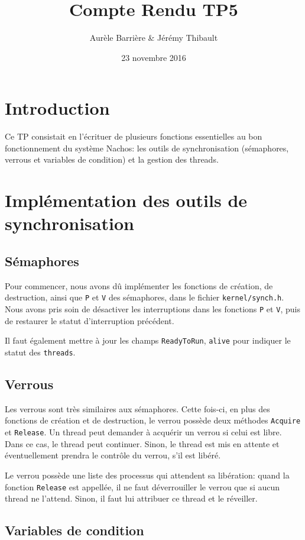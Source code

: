 \documentclass{article}
\title{Compte Rendu TP5}
\author{Aurèle Barrière \& Jérémy Thibault}
\date{23 novembre 2016}
\def\file#1{\texttt{#1}}
\def\fun#1{\texttt{#1}}
\def\obj#1{\texttt{#1}}
\begin{document}
\maketitle

\section*{Introduction}

Ce TP consistait en l'écrituer de plusieurs fonctions essentielles au bon fonctionnement du système Nachos: les outils de synchronisation (sémaphores, verrous et variables de condition) et la gestion des threads.

\section{Implémentation des outils de synchronisation}
\subsection{Sémaphores}

  Pour commencer, nous avons dû implémenter les fonctions de création, de destruction, ainsi que \fun{P} et \fun{V} des sémaphores, dans le fichier \file{kernel/synch.h}. Nous avons pris soin de désactiver les interruptions dans les fonctions \fun{P} et \fun{V}, puis de restaurer le statut d'interruption précédent.

  Il faut également mettre à jour les champs \obj{ReadyToRun}, \obj{alive} pour indiquer le statut des \obj{threads}.

\subsection{Verrous}

  Les verrous sont très similaires aux sémaphores. Cette fois-ci, en plus des fonctions de création et de destruction, le verrou possède deux méthodes \fun{Acquire} et \fun{Release}. Un thread peut demander à acquérir un verrou si celui est libre. Dans ce cas, le thread peut continuer. Sinon, le thread est mis en attente et éventuellement prendra le contrôle du verrou, s'il est libéré. %

  Le verrou possède une liste des processus qui attendent sa libération: quand la fonction \fun{Release} est appellée, il ne faut déverrouiller le verrou que si aucun thread ne l'attend. Sinon, il faut lui attribuer ce thread et le réveiller.

\subsection{Variables de condition}
\end{document}
